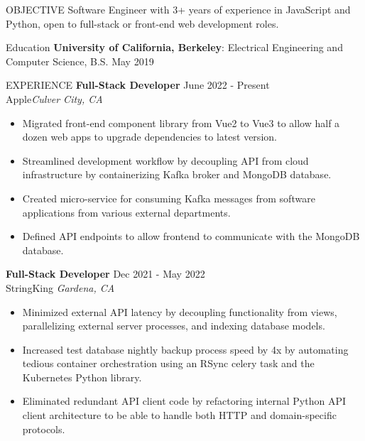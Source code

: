 \documentclass{resume}
\begin{document}
    \begin{rSection}{OBJECTIVE}
        {Software Engineer with 3+ years of experience in JavaScript and Python, open to full-stack or front-end web development roles.}
    \end{rSection}

    \begin{rSection}{Education}
        {\bf University of California, Berkeley}: Electrical Engineering and Computer Science, B.S. \hfill {May 2019}
    \end{rSection}

    \begin{rSection}{EXPERIENCE}
        \textbf{Full-Stack Developer} \hfill June 2022 - Present\\
        Apple\hfill \textit{Culver City, CA}
        \begin{itemize}
            \itemsep -3pt {} 
            \item Migrated front-end component library from Vue2 to Vue3 to allow half a dozen web apps to upgrade dependencies to latest version.
            \item Streamlined development workflow by decoupling API from cloud infrastructure by containerizing Kafka broker and MongoDB database.
            \item Created micro-service for consuming Kafka messages from software applications from various external departments. 
            \item Defined API endpoints to allow frontend to communicate with the MongoDB database.
        \end{itemize}
        \textbf{Full-Stack Developer} \hfill Dec 2021 - May 2022\\
        StringKing \hfill \textit{Gardena, CA}
        \begin{itemize}
            \itemsep -3pt {} 
            \item Minimized external API latency by decoupling functionality from views, parallelizing external server processes, and indexing database models.
            \item Increased test database nightly backup process speed by 4x by automating tedious container orchestration using an RSync celery task and the Kubernetes Python library.
            \item Eliminated redundant API client code by refactoring internal Python API client architecture to be able to handle both HTTP and domain-specific protocols.
        \end{itemize}

\end{rSection}
\end{document}
